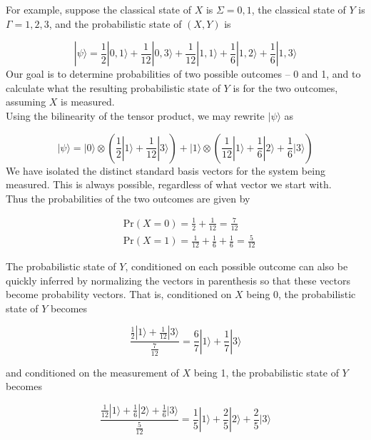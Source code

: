 \documentclass[svgnames]{article}     %
\begin{document}
For example, suppose the classical state of $X$ is $\Sigma = {0,1}$, the
classical state of  $Y$ is $\Gamma = {1, 2, 3}$, and the probabilistic state of
$(X, Y)$ is 

\[
|\psi\rangle  = \frac{1}{2}|0, 1\rangle + \frac{1}{12}|0,3\rangle
+ \frac{1}{12}|1,1\rangle + \frac{1}{6}|1, 2\rangle + \frac{1}{6}|1,3\rangle 
\] \vspace{5px}
Our goal is to determine probabilities of two possible outcomes -- 0 and 1, and
to calculate what the resulting probabilistic state of $Y$ is for the two
outcomes, assuming $X$ is measured. \\

Using the bilinearity of the tensor product, we may rewrite $|\psi\rangle $ as 

\[
|\psi\rangle = |0\rangle \otimes \left( \frac{1}{2}|1\rangle
  + \frac{1}{12}|3\rangle \right) + |1\rangle \otimes
  \left(\frac{1}{12}|1\rangle + \frac{1}{6}|2\rangle + \frac{1}{6}|3\rangle
    \right)
\] \vspace{5px}
We have isolated the distinct standard basis vectors for the system being
measured. This is always possible, regardless of what vector we start with. \\

Thus the probabilities of the two outcomes are given by 

\begin{align*}
&\text{Pr} (X=0) = \frac{1}{2} + \frac{1}{12} = \frac{7}{12} \\[5px]
&\text{Pr} (X=1) = \frac{1}{12} + \frac{1}{6} + \frac{1}{6} = \frac{5}{12}
\end{align*}

The probabilistic state of $Y$, conditioned on each possible outcome can also
be quickly inferred by normalizing the vectors in parenthesis so that these
vectors become probability vectors. That is, conditioned on $X$ being 0, the
probabilistic state of $Y$ becomes

\[
\frac{\frac{1}{2}|1\rangle + \frac{1}{12}|3\rangle }{\frac{7}{12}}
= \frac{6}{7}|1\rangle + \frac{1}{7}|3\rangle 
\] \vspace{5px}

and conditioned on the measurement of $X$ being 1, the probabilistic state of
$Y$ becomes


\[
\frac{\frac{1}{12}|1\rangle + \frac{1}{6}|2\rangle + \frac{1}{6}|3\rangle
}{\frac{5}{12}} = \frac{1}{5}|1\rangle + \frac{2}{5}|2\rangle + \frac{2}{5}|3\rangle 
\] \vspace{5px}
\end{document}
